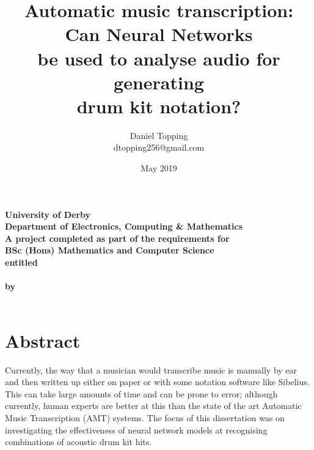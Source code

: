 \documentclass[12pt]{article}
\title{Automatic music transcription: Can Neural Networks\\ be used to analyse audio for generating\\ drum kit notation?}
\author{Daniel Topping\\dtopping256@gmail.com}
\date{May 2019}
\begin{document}
    
    \renewcommand*{\theparagraph}{\roman{paragraph}}
    \renewcommand\maketitlehooka{\null\mbox{}\vfill}
    \renewcommand\maketitlehookd{\vfill\null}
    \renewcommand*{\bigskip}{\vspace{1cm}}
    \renewcommand*{\thefootnote}{[\arabic{footnote}]}
	\pagestyle{plain}
	
	\begin{titlingpage}
    	\begin{Large}
    	    \begin{center}
    	        \vspace*{1cm}
        	    \textbf{University of Derby}\\
        	    \vspace{0.5cm}
        	    \textbf{Department of Electronics, Computing \& Mathematics}\\
        	    \vspace{1.5cm}
        	    \textbf{A project completed as part of the requirements for}\\
        	    \vspace{0.5cm}
        	    \textbf{BSc (Hons) Mathematics and Computer Science}\\
        	    \vspace{2cm}
        	    \textbf{entitled}\\
        	    \vspace{0.5cm}
        	    \makeatletter
        	    \textbf{\@title}\\
        	    \vspace{1.5cm}
        	    \textbf{by}\\
        	    \vspace{0.5cm}
        	    \textbf{\@author}\\
        	    \vspace{1.5cm}
        	    \textbf{\@date}
        	    \makeatother
    	    \end{center}
	    \end{Large}
	\end{titlingpage}
	
	\setcounter{page}{1}
	\section*{Abstract}
	
	Currently, the way that a musician would transcribe music is manually by ear and then written up either on paper or with some notation software like Sibelius. This can take large amounts of time and can be prone to error; although currently, human experts are better at this than the state of the art Automatic Music Transcription (AMT) systems. The focus of this dissertation was on investigating the effectiveness of neural network models at recognising combinations of acoustic drum kit hits.\medskip
	
\end{document}
